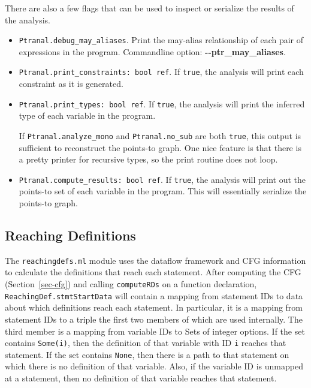 \documentclass[letterpaper]{article}
\def\secref#1{Section~\ref{sec-#1}}
\def\t#1{{\tt #1}}
\begin{document}
There are also a few flags that can be used to inspect or serialize
the results of the analysis.
\begin{itemize}
\item \t{Ptranal.debug\_may\_aliases}.
  Print the may-alias relationship of each pair of expressions in the
  program.  Commandline option: {\bf -{}-ptr\_may\_aliases}.
\item \t{Ptranal.print\_constraints: bool ref}.
  If \t{true}, the analysis will print each constraint as it is
  generated.
\item \t{Ptranal.print\_types: bool ref}.
  If \t{true}, the analysis will print the inferred type of each
  variable in the program.

  If \t{Ptranal.analyze\_mono} and \t{Ptranal.no\_sub} are both
  \t{true}, this output is sufficient to reconstruct the points-to
  graph.  One nice feature is that there is a pretty printer for
  recursive types, so the print routine does not loop.
\item \t{Ptranal.compute\_results: bool ref}.
  If \t{true}, the analysis will print out the points-to set of each
  variable in the program.  This will essentially serialize the
  points-to graph.
\end{itemize}


\subsection{Reaching Definitions}

The \t{reachingdefs.ml} module uses the dataflow framework and CFG
information to calculate the definitions that reach each
statement. After computing the CFG (\secref{cfg}) and calling
\t{computeRDs} on a
function declaration, \t{ReachingDef.stmtStartData} will contain a
mapping from statement IDs to data about which definitions reach each
statement. In particular, it is a mapping from statement IDs to a
triple the first two members of which are used internally. The third
member is a mapping from variable IDs to Sets of integer options. If
the set contains \t{Some(i)}, then the definition of that variable
with ID \t{i} reaches that statement. If the set contains \t{None},
then there is a path to that statement on which there is no definition
of that variable.  Also, if the variable ID is unmapped at a
statement, then no definition of that variable reaches that statement.
\end{document}
